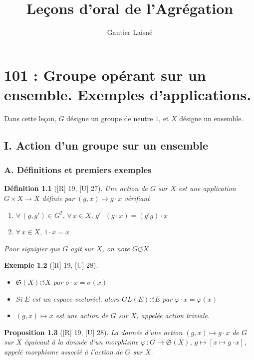 \documentclass[10pt, a4paper, parskip=full, twoside, twocolumn]{report}
\title{Leçons d'oral de l'Agrégation}
\author{Gautier Laisné}
\date{}
\newtheorem{definition}{Définition}
\newtheorem{proposition}[definition]{Proposition}
\newtheorem{example}[definition]{Exemple}
\newcommand{\actson}{\circlearrowleft}
\begin{document}

\chapter{101 : Groupe opérant sur un ensemble. Exemples d'applications.}
Dans cette leçon, $G$ désigne un groupe de neutre $1$, et $X$ désigne un ensemble.
\section*{I. Action d'un groupe sur un ensemble}
\subsection*{A. Définitions et premiers exemples}
\begin{definition}[\textnormal{[R] 19, [U] 27}]
	Une \emph{action} de $G$ sur $X$ est une application $G\times X\to X$ définie par 
	$(g,x)\mapsto g\cdot x$ vérifiant
	\begin{enumerate}
		\item $\forall\, (g,g')\in G^2,\, \forall\, x\in X,\, g'\cdot (g\cdot x) = (g'g)\cdot x$
		\item $\forall\, x\in X,\, 1\cdot x = x$
	\end{enumerate}
	Pour signigier que $G$ agit sur $X$, on note $G\actson X$.
\end{definition}

\begin{example}[\textnormal{[R] 19, [U] 28}]
	\begin{itemize}
		\item $\mathfrak{S}(X) \actson X$ par $\sigma\cdot x = \sigma(x)$
		\item Si $E$ est un espace vectoriel, alors $GL(E)\actson E$ par $\varphi\cdot x = \varphi(x)$
		\item $(g,x)\mapsto x$ est une action de $G$ sur $X$, appelée \emph{action triviale}.
	\end{itemize}
\end{example}

\begin{proposition}[\textnormal{[R] 19, [U] 28}]
	La donnée d'une action $(g,x)\mapsto g\cdot x$ de $G$ sur $X$ équivaut à la donnée d'un morphisme $\varphi\,\colon G\to \mathfrak{S}(X)$, $g\mapsto \left[x\mapsto g\cdot x\right]$, appelé \emph{morphisme associé à l'action de $G$ sur $X$}.
\end{proposition}
\end{document}
